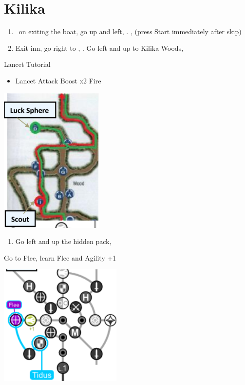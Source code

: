 \chapter{Kilika}

\begin{enumerate}
	\item \sd\ on exiting the boat, go up and left, \sd. \skippablefmv[2:00], (press Start immediately after skip) \sd
	\item Exit inn, go right to \wakka, \sd. Go left and up to Kilika Woods, \sd
\end{enumerate}
\begin{battle}{Lancet Tutorial}
	\begin{itemize}
		\item \sd
		\kimahrif Lancet
		\tidusf Attack
		\summon{\valefor}
		\valeforf Boost x2
		\valeforf Fire
	\end{itemize}
\end{battle}
\includegraphics{graphics/kilikamap}
\begin{enumerate}[resume]
	\item Go left and up the hidden pack, 
\end{enumerate}
\begin{spheregrid}
	\begin{itemize}
		\tidusf Go to Flee, learn Flee and Agility +1
	\end{itemize}
	\includegraphics{graphics/tidusflee}
\end{spheregrid}
